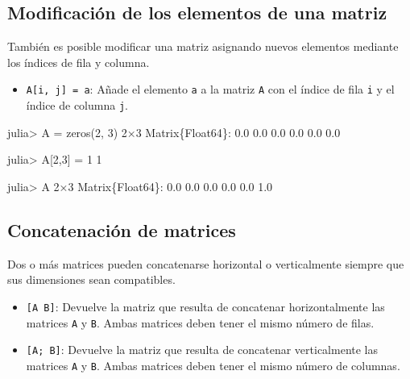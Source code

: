 \documentclass[
  letterpaper,
  DIV=11,
  numbers=noendperiod]{scrreprt}
\newenvironment{Shaded}{\begin{snugshade}}{\end{snugshade}}
\newcommand{\DataTypeTok}[1]{\textcolor[rgb]{0.68,0.00,0.00}{#1}}
\newcommand{\FloatTok}[1]{\textcolor[rgb]{0.68,0.00,0.00}{#1}}
\newcommand{\FunctionTok}[1]{\textcolor[rgb]{0.28,0.35,0.67}{#1}}
\newcommand{\NormalTok}[1]{\textcolor[rgb]{0.00,0.23,0.31}{#1}}
\newcommand{\OperatorTok}[1]{\textcolor[rgb]{0.37,0.37,0.37}{#1}}
\providecommand{\tightlist}{%
  \setlength{\itemsep}{0pt}\setlength{\parskip}{0pt}}\usepackage{longtable,booktabs,array}
\begin{document}
\hypertarget{modificaciuxf3n-de-los-elementos-de-una-matriz}{%
\subsection{Modificación de los elementos de una
matriz}\label{modificaciuxf3n-de-los-elementos-de-una-matriz}}

También es posible modificar una matriz asignando nuevos elementos
mediante los índices de fila y columna.

\begin{itemize}
\tightlist
\item
  \texttt{A{[}i,\ j{]}\ =\ a}: Añade el elemento \texttt{a} a la matriz
  \texttt{A} con el índice de fila \texttt{i} y el índice de columna
  \texttt{j}.
\end{itemize}

\begin{Shaded}
\begin{Highlighting}[]
\NormalTok{julia}\OperatorTok{\textgreater{}}\NormalTok{ A }\OperatorTok{=} \FunctionTok{zeros}\NormalTok{(}\FloatTok{2}\NormalTok{, }\FloatTok{3}\NormalTok{)}
\FloatTok{2}\OperatorTok{×}\FloatTok{3} \DataTypeTok{Matrix}\NormalTok{\{}\DataTypeTok{Float64}\NormalTok{\}}\OperatorTok{:}
 \FloatTok{0.0}  \FloatTok{0.0}  \FloatTok{0.0}
 \FloatTok{0.0}  \FloatTok{0.0}  \FloatTok{0.0}

\NormalTok{julia}\OperatorTok{\textgreater{}}\NormalTok{ A[}\FloatTok{2}\NormalTok{,}\FloatTok{3}\NormalTok{] }\OperatorTok{=} \FloatTok{1}
\FloatTok{1}

\NormalTok{julia}\OperatorTok{\textgreater{}}\NormalTok{ A}
\FloatTok{2}\OperatorTok{×}\FloatTok{3} \DataTypeTok{Matrix}\NormalTok{\{}\DataTypeTok{Float64}\NormalTok{\}}\OperatorTok{:}
 \FloatTok{0.0}  \FloatTok{0.0}  \FloatTok{0.0}
 \FloatTok{0.0}  \FloatTok{0.0}  \FloatTok{1.0}
\end{Highlighting}
\end{Shaded}

\hypertarget{concatenaciuxf3n-de-matrices}{%
\subsection{Concatenación de
matrices}\label{concatenaciuxf3n-de-matrices}}

Dos o más matrices pueden concatenarse horizontal o verticalmente
siempre que sus dimensiones sean compatibles.

\begin{itemize}
\tightlist
\item
  \texttt{{[}A\ B{]}}: Devuelve la matriz que resulta de concatenar
  horizontalmente las matrices \texttt{A} y \texttt{B}. Ambas matrices
  deben tener el mismo número de filas.
\item
  \texttt{{[}A;\ B{]}}: Devuelve la matriz que resulta de concatenar
  verticalmente las matrices \texttt{A} y \texttt{B}. Ambas matrices
  deben tener el mismo número de columnas.
\end{itemize}
\end{document}

